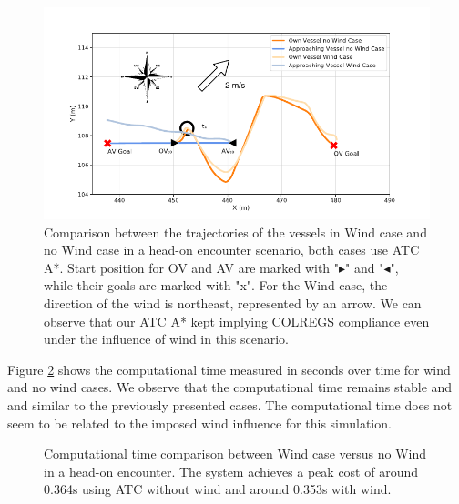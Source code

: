         \begin{figure}[H]
            \centering
            \includegraphics[width=\textwidth]{figs/Chap5/plot_ho_w_vs_wind.pdf}
            \caption{Comparison between the trajectories of the vessels in Wind case and no Wind case in a head-on encounter scenario, both cases use \ac{ATC} A*. Start position for \ac{OV} and \ac{AV} are marked with "$\blacktriangleright$" and "$\blacktriangleleft$", while their goals are marked with "x". For the Wind case, the direction of the wind is northeast, represented by an arrow. We can observe that our \ac{ATC} A* kept implying COLREGS compliance even under the influence of wind in this scenario.}
            \label{fig:plot_ho_w_vs_wind}
        \end{figure}
        
        Figure \ref{fig:plot_ho_w_vs_wind_CT} shows the computational time measured in seconds over time for wind and no wind cases. We observe that the computational time remains stable and and similar to the previously presented cases. The computational time does not seem to be related to the imposed wind influence for this simulation.
        \begin{figure}[H]
            \centering
            
            \caption{Computational time comparison between Wind case versus no Wind in a head-on encounter. The system achieves a peak cost of around 0.364s using \ac{ATC} without wind and around 0.353s with wind.}
            \label{fig:plot_ho_w_vs_wind_CT}
        \end{figure}
        
